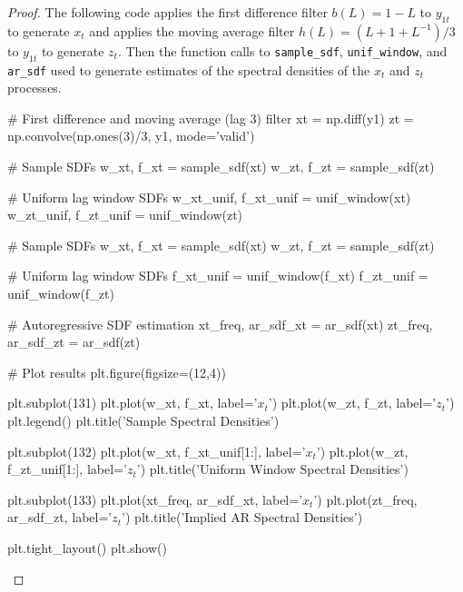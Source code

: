 \documentclass[oneside,reqno]{amsart}
\theoremstyle{definition}
\begin{document}
\begin{proof}
The following code applies the first difference filter $b(L) = 1-L$ to $y_{1t}$ to generate $x_t$ and applies the moving average filter $h(L)=(L + 1 + L^{-1})/3$ to $y_{1t}$ to generate $z_t$. Then the function calls to \texttt{sample_sdf},  \texttt{unif_window}, and \texttt{ar_sdf} used to generate estimates of the spectral densities of the $x_t$ and $z_t$ processes. 


\begin{python3code}
# First difference and moving average (lag 3) filter 
xt = np.diff(y1)
zt = np.convolve(np.ones(3)/3, y1, mode='valid')

# Sample SDFs
w_xt, f_xt = sample_sdf(xt)
w_zt, f_zt = sample_sdf(zt)

# Uniform lag window SDFs
w_xt_unif, f_xt_unif = unif_window(xt)
w_zt_unif, f_zt_unif = unif_window(zt)

# Sample SDFs
w_xt, f_xt = sample_sdf(xt)
w_zt, f_zt = sample_sdf(zt)

# Uniform lag window SDFs
f_xt_unif = unif_window(f_xt)
f_zt_unif = unif_window(f_zt)

# Autoregressive SDF estimation 
xt_freq, ar_sdf_xt = ar_sdf(xt)
zt_freq, ar_sdf_zt = ar_sdf(zt)

# Plot results
plt.figure(figsize=(12,4))

plt.subplot(131)
plt.plot(w_xt, f_xt, label='$x_t$')
plt.plot(w_zt, f_zt, label='$z_t$')
plt.legend()
plt.title('Sample Spectral Densities')

plt.subplot(132)
plt.plot(w_xt, f_xt_unif[1:], label='$x_t$')
plt.plot(w_zt, f_zt_unif[1:], label='$z_t$')
plt.title('Uniform Window Spectral Densities')

plt.subplot(133)
plt.plot(xt_freq, ar_sdf_xt, label='$x_t$')
plt.plot(zt_freq, ar_sdf_zt, label='$z_t$')
plt.title('Implied AR Spectral Densities')

plt.tight_layout()
plt.show()
\end{python3code}


\end{proof}
\end{document}
